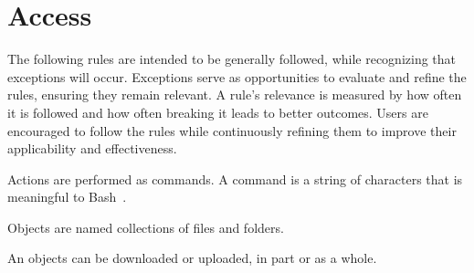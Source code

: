 \section{Access}

\begin{ruledef}[Rules]
The following rules are intended to be generally followed, while recognizing that exceptions will occur. Exceptions serve as opportunities to evaluate and refine the rules, ensuring they remain relevant. A rule's relevance is measured by how often it is followed and how often breaking it leads to better outcomes. Users are encouraged to follow the rules while continuously refining them to improve their applicability and effectiveness.
\end{ruledef}

\begin{ruledef}[Commands]
Actions are performed as commands. A command is a string of characters that is meaningful to Bash~\cite{gnu_bash}.
\end{ruledef}

\begin{ruledef}[Objects]
Objects are named collections of files and folders.
\end{ruledef}

\begin{ruledef}
An objects can be downloaded or uploaded, in part or as a whole.
\end{ruledef}
    

